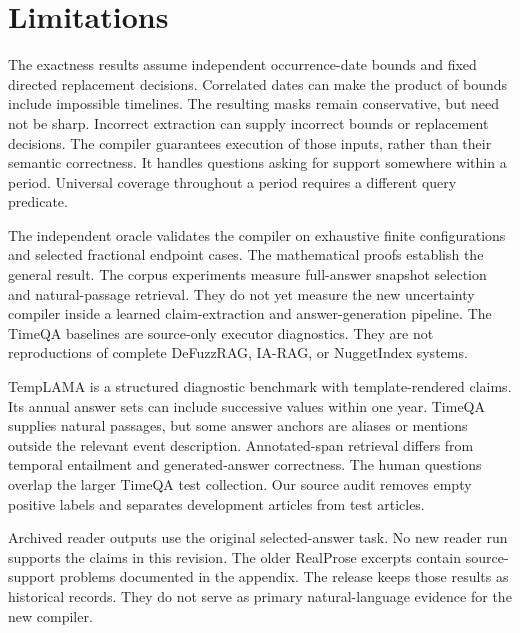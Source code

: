 \section*{Limitations}
The exactness results assume independent occurrence-date bounds and fixed directed replacement decisions.
Correlated dates can make the product of bounds include impossible timelines.
The resulting masks remain conservative, but need not be sharp.
Incorrect extraction can supply incorrect bounds or replacement decisions.
The compiler guarantees execution of those inputs, rather than their semantic correctness.
It handles questions asking for support somewhere within a period.
Universal coverage throughout a period requires a different query predicate.

The independent oracle validates the compiler on exhaustive finite configurations and selected fractional endpoint cases.
The mathematical proofs establish the general result.
The corpus experiments measure full-answer snapshot selection and natural-passage retrieval.
They do not yet measure the new uncertainty compiler inside a learned claim-extraction and answer-generation pipeline.
The TimeQA baselines are source-only executor diagnostics.
They are not reproductions of complete DeFuzzRAG, IA-RAG, or NuggetIndex systems.

TempLAMA is a structured diagnostic benchmark with template-rendered claims.
Its annual answer sets can include successive values within one year.
TimeQA supplies natural passages, but some answer anchors are aliases or mentions outside the relevant event description.
Annotated-span retrieval differs from temporal entailment and generated-answer correctness.
The human questions overlap the larger TimeQA test collection.
Our source audit removes empty positive labels and separates development articles from test articles.

Archived reader outputs use the original selected-answer task.
No new reader run supports the claims in this revision.
The older RealProse excerpts contain source-support problems documented in the appendix.
The release keeps those results as historical records.
They do not serve as primary natural-language evidence for the new compiler.
